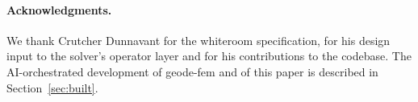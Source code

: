 \documentclass{anvil-paper}
\begin{document}
\paragraph{Acknowledgments.}
We thank Crutcher Dunnavant for the whiteroom specification, for his
design input to the solver's operator layer and for his contributions to
the codebase. The AI-orchestrated development of geode-fem and of this
paper is described in Section~\ref{sec:built}.



\end{document}
